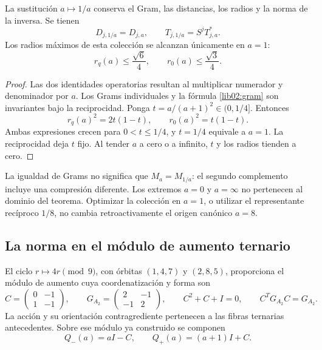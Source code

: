 \begin{proposition}
\label{lib02:dualidad-a}
La sustitución \(a\mapsto1/a\) conserva el Gram, las distancias,
los radios y la norma de la inversa. Se tienen
\[
 D_{j,1/a}=D_{j,a},\qquad
 T_{j,1/a}=S^jT_{j,a}^*.
\]
Los radios máximos de esta colección se alcanzan únicamente en \(a=1\):
\[
 r_q(a)\leq\frac{\sqrt6}{4},\qquad
 r_0(a)\leq\frac{\sqrt3}{4}.
\]
\end{proposition}
\begin{proof}
Las dos identidades operatorias resultan al multiplicar numerador y
denominador por \(a\). Los Grams individuales y la fórmula
\eqref{lib02:gram} son invariantes bajo la reciprocidad. Ponga
\(t=a/(a+1)^2\in(0,1/4]\). Entonces
\[
 r_q(a)^2=2t(1-t),\qquad r_0(a)^2=t(1-t).
\]
Ambas expresiones crecen para \(0<t\leq1/4\), y \(t=1/4\)
equivale a \(a=1\). La reciprocidad deja \(t\) fijo. Al tender
\(a\) a cero o a infinito, \(t\) y los radios tienden a cero.
\end{proof}

La igualdad de Grams no significa que \(M_a=M_{1/a}\): el segundo
complemento incluye una compresión diferente. Los extremos \(a=0\)
y \(a=\infty\) no pertenecen al dominio del teorema. Optimizar la
colección en \(a=1\), o utilizar el representante recíproco \(1/8\),
no cambia retroactivamente el origen canónico \(a=8\).

\subsection{La norma en el módulo de aumento ternario}
\label{lib02:modulo-ternario}

El ciclo \(r\mapsto4r\pmod9\), con órbitas \((1,4,7)\) y
\((2,8,5)\), proporciona el módulo de aumento cuya coordenatización y forma son
\[
 C=\begin{pmatrix}0&-1\\1&-1\end{pmatrix},\qquad
 G_{A_2}=\begin{pmatrix}2&-1\\-1&2\end{pmatrix},\qquad
 C^2+C+I=0,\qquad C^TG_{A_2}C=G_{A_2}.
\]
La acción y su orientación contragrediente pertenecen a las fibras
ternarias antecedentes. Sobre ese módulo ya construido se componen
\[
 Q_-(a)=aI-C,\qquad Q_+(a)=(a+1)I+C.
\]

